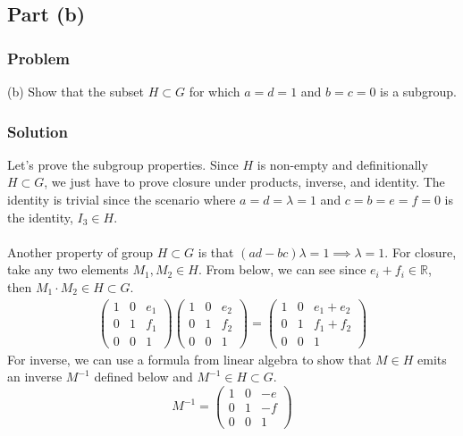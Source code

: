 \subsection{Part (b)}
\subsubsection{Problem}
(b) Show that the subset $H \subset G$ for which $a = d = 1$ and $b = c = 0$ is a subgroup.
\subsubsection{Solution}

Let's prove the subgroup properties. Since $H$ is non-empty and definitionally $H \subset G$, we just have to prove closure under products, inverse, and identity. The identity is trivial since the scenario where $a=d=\lambda = 1$ and $c=b=e=f=0$ is the identity, $I_3 \in H$.\\
\\
Another property of group $H \subset G$ is that $(ad - bc)\lambda = 1 \implies \lambda = 1$. For closure, take any two elements $M_1, M_2 \in H$. From below, we can see since $e_i + f_i \in \mathbb{R}$, then $M_1 \cdot M_2 \in H \subset G$.
\begin{align*}
    \begin{pmatrix}
        1 & 0 & e_1 \\
        0 & 1 & f_1 \\
        0 & 0 & 1
    \end{pmatrix}    
    \begin{pmatrix}
        1 & 0 & e_2 \\
        0 & 1 & f_2 \\
        0 & 0 & 1
    \end{pmatrix} = \begin{pmatrix}
        1 & 0 & e_1 + e_2 \\
        0 & 1 & f_1 + f_2 \\
        0 & 0 & 1
    \end{pmatrix}
\end{align*}
For inverse, we can use a formula from linear algebra to show that $M \in H$ emits an inverse $M^{-1}$ defined below and $M^{-1} \in H \subset G$.
$$
M^{-1} = \begin{pmatrix}
        1 & 0 & -e \\
        0 & 1 & -f \\
        0 & 0 & 1
    \end{pmatrix} 
$$



